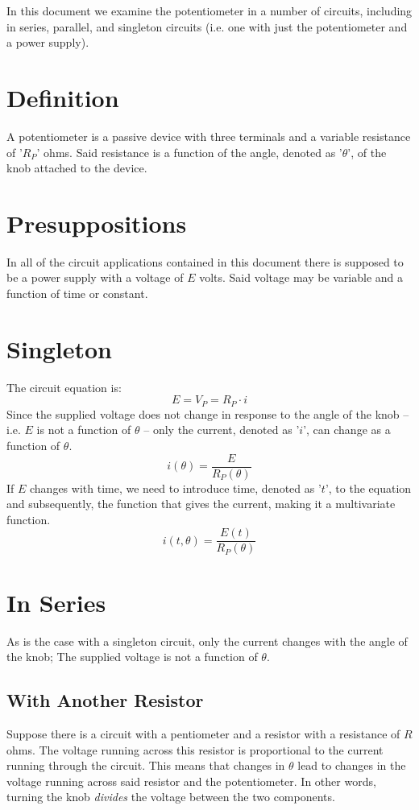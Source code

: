 \documentclass{article}
\begin{document}
	In this document we examine the potentiometer in a number of circuits, 
	including in series, parallel, and singleton circuits (i.e. one with just 
	the potentiometer and a power supply).
	\section{Definition}\label{sec:definition}
	A potentiometer is a passive device with three terminals and a variable 
	resistance of '$R_P$' ohms.  Said resistance is a function of the angle, 
	denoted as '$\theta$', of the knob attached to the device.
	\section{Presuppositions}
	In all of the circuit applications contained in this document there is 
	supposed to be a power supply with a voltage of $E$ volts.  Said voltage 
	may be variable and a function of time or constant.
	\section{Singleton}
	The circuit equation is:
	\begin{equation}\label{eq:V_P}
		E = V_P = R_P \cdot i
	\end{equation}
	Since the supplied voltage does not change in response to the angle of the 
	knob -- i.e. $E$ is not a function of $\theta$ -- only the current, denoted 
	as '$i$', can change as a function of $\theta$.
	$$ i(\theta) = \frac{E}{R_P(\theta)}$$
	If $E$ changes with time, we need to introduce time, denoted as '$t$', to 
	the equation and subsequently, the function that gives the current, making 
	it a multivariate function.
	$$ i(t, \theta) = \frac{E(t)}{R_P(\theta)}$$
	\section[Series]{In Series}
	As is the case with a singleton circuit, only the current changes with the 
	angle of the knob;  The supplied voltage is not a function of $\theta$.
	\subsection[Resistor]{With Another Resistor}
	Suppose there is a circuit with a pentiometer and a resistor with 
	a resistance of $R$ ohms.  The voltage running across this resistor is 
	proportional to the current running through the circuit.  This means that 
	changes in $\theta$ lead to changes in the voltage running across said 
	resistor and the potentiometer.  In other words, turning the knob 	
	\emph{divides} the voltage between the two components.
\end{document}
